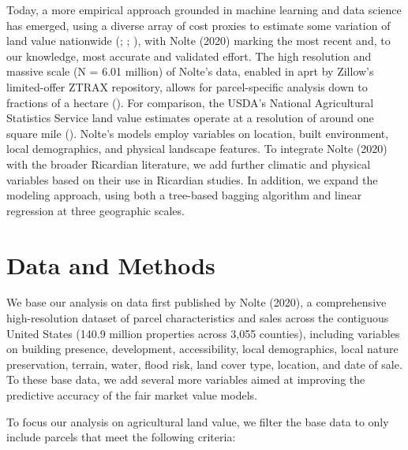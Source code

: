 \documentclass[12pt]{article}
\begin{document}
\par Today, a more empirical approach grounded in machine learning and data science has emerged, using a diverse array of cost proxies to estimate some variation of land value nationwide (\cite{Withey2012MaximisingUSA}; 
\cite{Johnson2020AReduction}; \cite{Lawler2020PlanningConfiguration}), with Nolte (2020) marking the most recent and, to our knowledge, most accurate and validated effort. The high resolution and massive scale (N = 6.01 million) of Nolte's data, enabled in aprt by Zillow's limited-offer ZTRAX repository, allows for parcel-specific analysis down to fractions of a hectare (\cite{Zillow2019ZTRAX:2019-Q4}). For comparison, the USDA's National Agricultural Statistics Service land value estimates operate at a resolution of around one square mile (\cite{USDepartmentofAgriculture2019AgriculturalEstimates}). Nolte's models employ variables on location, built environment, local demographics, and physical landscape features. To integrate Nolte (2020) with the broader Ricardian literature, we add further climatic and physical variables based on their use in Ricardian studies. In addition, we expand the modeling approach, using both a tree-based bagging algorithm and linear regression at three geographic scales.

\section{Data and Methods}
We base our analysis on data first published by Nolte (2020), a comprehensive high-resolution dataset of parcel characteristics and sales across the contiguous United States (140.9 million properties across 3,055 counties), including variables on building presence, development, accessibility, local demographics, local nature preservation, terrain, water, flood risk, land cover type, location, and date of sale. To these base data, we add several more variables aimed at improving the predictive accuracy of the fair market value models.

To focus our analysis on agricultural land value, we filter the base data to only include parcels that meet the following criteria:
\end{document}
